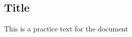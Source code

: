 \subsection{Title}

\begin{flushleft}
    This is a practice text for the document 
\end{flushleft}
